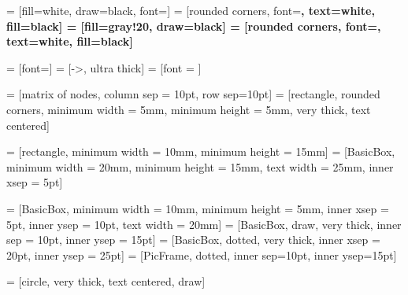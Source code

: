 \pagestyle{empty}

\usepackage{graphicx}
\usepackage{tikz}
\usepackage{xspace}
\usepackage{amsmath,amssymb}


\graphicspath{{image/}}


\usetikzlibrary{shapes.symbols}
\usetikzlibrary{shapes.geometric}
\usetikzlibrary{shapes.arrows}
\usetikzlibrary{shapes.misc}
\usetikzlibrary{shapes.arrows}
\usetikzlibrary{shapes.callouts}
\usetikzlibrary{decorations.text}
\usetikzlibrary{trees}
\usetikzlibrary{scopes}
\usetikzlibrary{arrows}
\usetikzlibrary{matrix}
\usetikzlibrary{chains}
\usetikzlibrary{positioning}
\usetikzlibrary{fit}

  = [fill=white, draw=black, font=\sffamily]
 = [rounded corners, font=\bfseries\sffamily, text=white, fill=black]
   = [fill=gray!20, draw=black]
  = [rounded corners, font=\bfseries\sffamily, text=white, fill=black]

 = [font=\sffamily\small]
  = [->, ultra thick]
      = [font = \footnotesize]

 = [matrix of nodes, column sep = 10pt, row sep=10pt]
    = [rectangle, rounded corners, minimum width = 5mm, minimum height = 5mm, very thick, text centered]

       = [rectangle, minimum width = 10mm, minimum height = 15mm]
    = [BasicBox, minimum width = 20mm, minimum height = 15mm, text width = 25mm, inner xsep = 5pt]

            = [BasicBox, minimum width = 10mm, minimum height = 5mm, inner xsep = 5pt, inner ysep = 10pt, text width = 20mm]
      = [BasicBox, draw, very thick, inner sep = 10pt, inner ysep = 15pt]
 = [BasicBox, dotted, very thick, inner xsep = 20pt, inner ysep = 25pt]
    = [PicFrame, dotted, inner sep=10pt, inner ysep=15pt]

 = [circle, very thick, text centered, draw]

